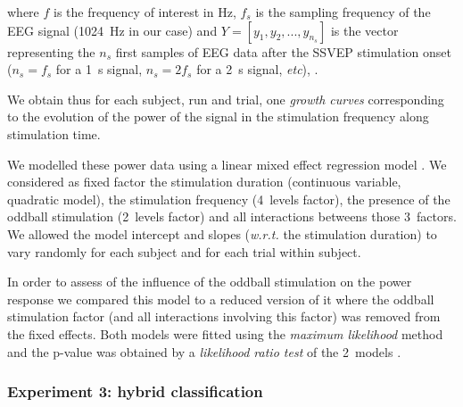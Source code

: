 \documentclass[10pt]{article}
\begin{document}
        where $f$ is the frequency of interest in \si{\hertz}, $f_s$ is the sampling frequency of the EEG signal (\SI{1024}{\hertz} in our case) and $Y=[y_1, y_2, ..., y_{n_s}]$ is the vector representing the $n_s$ first samples of EEG data after the SSVEP stimulation onset ($n_s=f_s$ for a \SI{1}{\s} signal, $n_s=2f_s$ for a \SI{2}{\s} signal, \emph{etc}), .

        We obtain thus for each subject, run and trial, one \emph{growth curves} corresponding to the evolution of the power of the signal in the stimulation frequency along stimulation time.

        We modelled these power data using a linear mixed effect regression model \parencite{Pinheiro2000}.
        We considered as fixed factor the stimulation duration (continuous variable, quadratic model), the stimulation frequency (4~levels factor), the presence of the oddball stimulation (2~levels factor) and all interactions betweens those 3~factors.
        We allowed the model intercept and slopes (\emph{w.r.t.} the stimulation duration) to vary randomly for each subject and for each trial within subject.

        In order to assess of the influence of the oddball stimulation on the power response we compared this model to a reduced version of it where the oddball stimulation factor (and all interactions involving this factor) was removed from the fixed effects.
        Both models were fitted using the \emph{maximum likelihood} method and the p-value was obtained by a \emph{likelihood ratio test} of the 2~models \parencite{Pinheiro2000}.





        \subsubsection{Experiment 3: hybrid classification}
        \label{sec:2.3.3AnalysisExp3}
\end{document}
